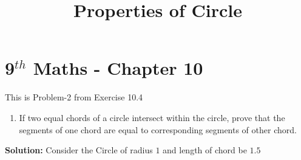 \documentclass[jornel,10pt,twocolumn]{article}
\newcommand{\solution}{\noindent \textbf{Solution: }}
\begin{document}
\begin{center}
\title{\textbf{Properties of Circle}}
\date{\vspace{-5ex}} %
\maketitle
\end{center}

\setcounter{page}{1}

\section{9$^{th}$ Maths - Chapter 10}

This is Problem-2 from Exercise 10.4

\begin{enumerate}
\item If two equal chords of a circle intersect within the circle, prove that the segments of one chord are equal to corresponding segments of other chord.
\end{enumerate}
\solution
Consider the Circle of radius $1$ and length of chord be $1.5$
\begin{table}[ht!]
	
\caption{}
\label{table}	
\end{table}
\end{document}
